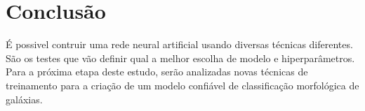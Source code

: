 \section*{Conclusão}

É possivel contruir uma rede neural artificial usando diversas técnicas diferentes. São os testes que vão definir qual a melhor escolha de modelo e hiperparâmetros. Para a próxima etapa deste estudo, serão analizadas novas técnicas de treinamento para a criação de um modelo confiável de classificação morfológica de galáxias.